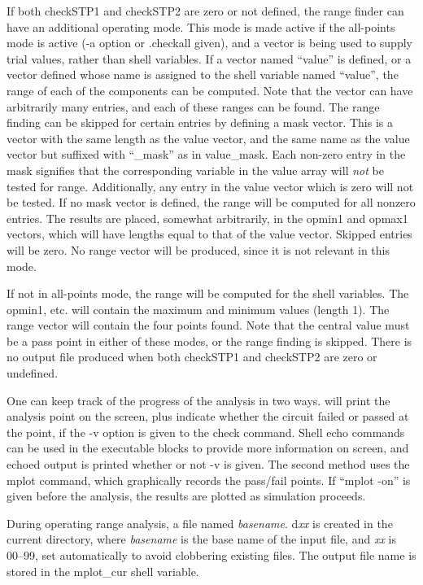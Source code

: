 If both {\et checkSTP1} and {\et checkSTP2} are zero or not defined,
the range finder can have an additional operating mode.  This mode is
made active if the all-points mode is active ({\vt -a} option or {\vt
.checkall} given), and a vector is being used to supply trial values,
rather than shell variables.  If a vector named ``value'' is defined,
or a vector defined whose name is assigned to the shell variable named
``value'', the range of each of the components can be computed.  Note
that the vector can have arbitrarily many entries, and each of these
ranges can be found.  The range finding can be skipped for certain
entries by defining a mask vector.  This is a vector with the same
length as the {\et value} vector, and the same name as the {\et value}
vector but suffixed with ``{\vt \_mask}'' as in {\et value\_mask}. 
Each non-zero entry in the mask signifies that the corresponding
variable in the {\et value} array will {\it not} be tested for range. 
Additionally, any entry in the {\et value} vector which is zero will
not be tested.  If no mask vector is defined, the range will be
computed for all nonzero entries.  The results are placed, somewhat
arbitrarily, in the {\et opmin1} and {\et opmax1} vectors, which will
have lengths equal to that of the {\et value} vector.  Skipped entries
will be zero.  No {\et range} vector will be produced, since it is not
relevant in this mode.

If not in all-points mode, the range will be computed for the shell
variables.  The {\et opmin1}, etc. will contain the maximum and
minimum values (length 1).  The {\et range} vector will contain the
four points found.  Note that the central value must be a pass point
in either of these modes, or the range finding is skipped.  There is
no output file produced when both {\et checkSTP1} and {\et checkSTP2}
are zero or undefined.

One can keep track of the progress of the analysis in two ways. 
{\WRspice} will print the analysis point on the screen, plus indicate
whether the circuit failed or passed at the point, if the {\vt -v}
option is given to the {\cb check} command.  Shell {\cb echo} commands
can be used in the executable blocks to provide more information on
screen, and echoed output is printed whether or not {\vt -v} is given. 
The second method uses the {\cb mplot} command, which graphically
records the pass/fail points.  If ``{\vt mplot -on}'' is given before
the analysis, the results are plotted as simulation proceeds.

During operating range analysis, a file named {\it basename\/}.{\vt
d}{\it xx} is created in the current directory, where {\it basename}
is the base name of the input file, and {\it xx} is 00--99, set
automatically to avoid clobbering existing files.  The output file
name is stored in the {\et mplot\_cur} shell variable.

